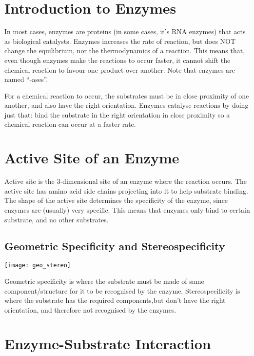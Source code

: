 \section{Introduction to Enzymes}

In most cases, enzymes are proteins (in some cases, it's RNA enzymes) that acts as biological catalysts.
Enzymes increases the rate of reaction, but does NOT change the equilibrium, nor the thermodynamics of a reaction.
This means that, even though enzymes make the reactions to occur faster, it cannot shift the chemical reaction to favour one product over another.
Note that enzymes are named ``-ases''.

For a chemical reaction to occur, the substrates must be in close proximity of one another, and also have the right orientation.
Enzymes catalyse reactions by doing just that: bind the substrate in the right orientation in close proximity so a chemical reaction can occur at a faster rate.

\section{Active Site of an Enzyme}

Active site is the 3-dimensional site of an enzyme where the reaction occurs.
The active site has amino acid side chains projecting into it to help substrate binding.
The shape of the active site determines the specificity of the enzyme, since enzymes are (usually) very specific.
This means that enzymes only bind to certain substrate, and no other substrates.

\subsection{Geometric Specificity and Stereospecificity}

\begin{center}
\texttt{[image: geo\_stereo]}
\end{center}
Geometric specificity is where the substrate must be made of same component/structure for it to be recognised by the enzyme.
Stereospecificity is where the substrate has the required components,but don't have the right orientation, and therefore not recognised by the enzymes.

\section{Enzyme-Substrate Interaction}

